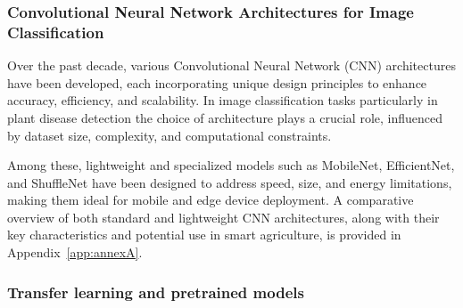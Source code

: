 


\subsubsection{Convolutional Neural Network Architectures for Image Classification}

Over the past decade, various Convolutional Neural Network (CNN) architectures have been developed, each incorporating unique design principles to enhance accuracy, efficiency, and scalability. In image classification tasks particularly in plant disease detection the choice of architecture plays a crucial role, influenced by dataset size, complexity, and computational constraints.

Among these, lightweight and specialized models such as MobileNet, EfficientNet, and ShuffleNet have been designed to address speed, size, and energy limitations, making them ideal for mobile and edge device deployment. A comparative overview of both standard and lightweight CNN architectures, along with their key characteristics and potential use in smart agriculture, is provided in Appendix~\ref{app:annexA}.

\subsubsection{Transfer learning and pretrained models}

